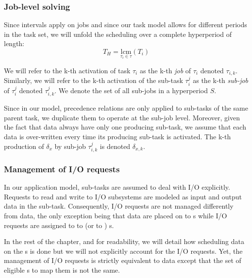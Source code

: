 \documentclass[main.tex]{subfiles}
\begin{document}
\subsubsection{Job-level solving}
Since intervals apply on jobs and since our task model allows for different periods in the task set, we will unfold the scheduling over a complete hyperperiod of length:
\begin{displaymath}
    T_H = \underset{\tau_i \in \tau}{\text{lcm}} (T_i)
\end{displaymath}

We will refer to the k-th activation of task $\tau_i$ as the k-th \emph{job} of $\tau_i$ denoted $\tau_{i,k}$. Similarly, we will refer to the k-th activation of the sub-task $\tau_i^j$ as the k-th \emph{sub-job} of $\tau_i^j$ denoted $\tau_{i,k}^j$. We denote the set of all sub-jobs in a hyperperiod $S$.

Since in our model, precedence relations are only applied to sub-tasks of the same parent task, we duplicate them to operate at the sub-job level. Moreover, given the fact that data always have only one producing sub-task, we assume that each data is over-written every time its producing sub-task is activated. The k-th production of $\delta_x$ by sub-job $\tau_{i,k}^j$ is denoted $\delta_{x,k}$.

\subsubsection{Management of I/O requests}
In our application model, sub-tasks are assumed to deal with I/O explicitly. Requests to read and write to I/O subsystems are modeled as input and output data in the sub-task. Consequently, I/O requests are not managed differently from data, the only exception being that data are placed on \PN{} to \PN{} \PC{}s while I/O requests are assigned to \PN{} to \ION{} (or \ION{} to \PN{}) \PC{}s. 

In the rest of the chapter, and for readability, we will detail how scheduling data on the \PC{}s is done but we will not explicitly account for the I/O requests. Yet, the management of I/O requests is strictly equivalent to data except that the set of eligible \PC{}s to map them is not the same.
\end{document}
